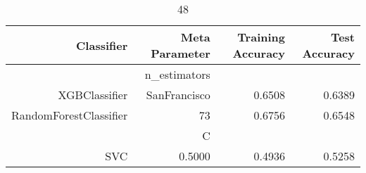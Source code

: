 
\begin{table}[H]
    \caption{48}
    \centering
    \begin{tabular}{|r|r|r|r|}
        \hline
        Classifier &Meta Parameter &Training Accuracy
        &Test Accuracy\\
        \hline
        &n\_estimators &\multicolumn{2}{|r|}{}\\
        \hline
        XGBClassifier &SanFrancisco &0.6508 &0.6389\\
        \hline
        RandomForestClassifier &73 &0.6756 &0.6548\\
        \hline
        &C &\multicolumn{2}{|r|}{}\\
        \hline
        SVC &0.5000 &0.4936 &0.5258\\
        \hline
    \end{tabular}
\end{table}
